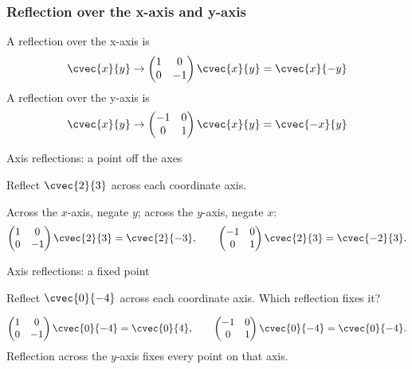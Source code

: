 \begin{frame}
\frametitle{Reflection over the x-axis and y-axis}
A reflection over the x-axis is
\[ \cvec{x}{y} \to \begin{pmatrix} 1 & 0 \\ 0 & -1 \end{pmatrix} \cvec{x}{y} = \cvec{x}{-y}\]
A reflection over the y-axis is
\[ \cvec{x}{y} \to \begin{pmatrix} -1 & 0 \\ 0 & 1 \end{pmatrix} \cvec{x}{y} = \cvec{-x}{y}\]
\end{frame}
\begin{frame}[t]{Axis reflections: a point off the axes}
\small
\begin{ex}
Reflect $\cvec{2}{3}$ across each coordinate axis.
\end{ex}
\begin{sol}
Across the $x$-axis, negate $y$; across the $y$-axis, negate $x$:\[\begin{pmatrix}1&0\\0&-1\end{pmatrix}\cvec{2}{3}=\cvec{2}{-3},\qquad\begin{pmatrix}-1&0\\0&1\end{pmatrix}\cvec{2}{3}=\cvec{-2}{3}.\]
\end{sol}
\end{frame}

\begin{frame}[t]{Axis reflections: a fixed point}
\small
\begin{ex}
Reflect $\cvec{0}{-4}$ across each coordinate axis. Which reflection fixes it?
\end{ex}
\begin{sol}
\[\begin{pmatrix}1&0\\0&-1\end{pmatrix}\cvec{0}{-4}=\cvec{0}{4},\qquad\begin{pmatrix}-1&0\\0&1\end{pmatrix}\cvec{0}{-4}=\cvec{0}{-4}.\] Reflection across the $y$-axis fixes every point on that axis.
\end{sol}
\end{frame}


\begin{frame}
\end{frame}

